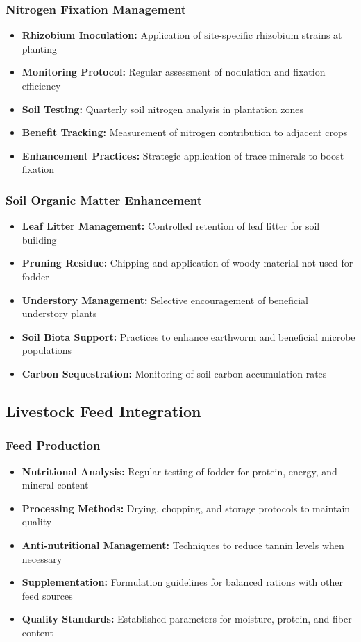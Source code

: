 \subsubsection{Nitrogen Fixation Management}
\begin{itemize}
    \item \textbf{Rhizobium Inoculation:} Application of site-specific rhizobium strains at planting
    \item \textbf{Monitoring Protocol:} Regular assessment of nodulation and fixation efficiency
    \item \textbf{Soil Testing:} Quarterly soil nitrogen analysis in plantation zones
    \item \textbf{Benefit Tracking:} Measurement of nitrogen contribution to adjacent crops
    \item \textbf{Enhancement Practices:} Strategic application of trace minerals to boost fixation
\end{itemize}

\subsubsection{Soil Organic Matter Enhancement}
\begin{itemize}
    \item \textbf{Leaf Litter Management:} Controlled retention of leaf litter for soil building
    \item \textbf{Pruning Residue:} Chipping and application of woody material not used for fodder
    \item \textbf{Understory Management:} Selective encouragement of beneficial understory plants
    \item \textbf{Soil Biota Support:} Practices to enhance earthworm and beneficial microbe populations
    \item \textbf{Carbon Sequestration:} Monitoring of soil carbon accumulation rates
\end{itemize}

\subsection{Livestock Feed Integration}

\subsubsection{Feed Production}
\begin{itemize}
    \item \textbf{Nutritional Analysis:} Regular testing of fodder for protein, energy, and mineral content
    \item \textbf{Processing Methods:} Drying, chopping, and storage protocols to maintain quality
    \item \textbf{Anti-nutritional Management:} Techniques to reduce tannin levels when necessary
    \item \textbf{Supplementation:} Formulation guidelines for balanced rations with other feed sources
    \item \textbf{Quality Standards:} Established parameters for moisture, protein, and fiber content
\end{itemize}


